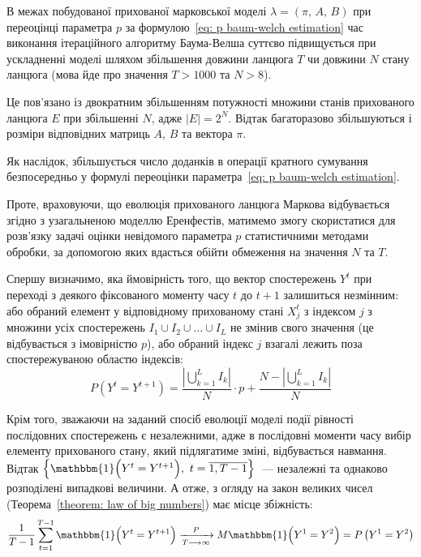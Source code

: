 В межах побудованої прихованої марковської моделі $\lambda=(\pi,\,A,\,B)$ при переоцінці параметра $p$ за формулою~\eqref{eq: p baum-welch estimation} час виконання ітераційного алгоритму Баума-Велша суттєво підвищується при ускладненні моделі шляхом збільшення довжини ланцюга $T$ чи довжини $N$ стану ланцюга (мова йде про значення $T>1000$ та $N>8$). 

Це пов'язано із двократним збільшенням потужності множини станів прихованого ланцюга $E$ при збільшенні $N$, адже $|E|=2^N$. Відтак багаторазово збільшуються і розміри відповідних матриць $A$, $B$ та вектора $\pi$. 

Як наслідок, збільшується число доданків в операції кратного сумування безпосередньо у формулі переоцінки параметра~\eqref{eq: p baum-welch estimation}.

Проте, враховуючи, що еволюція прихованого ланцюга Маркова відбувається згідно з узагальненою моделлю Еренфестів, матимемо змогу скористатися для розв'язку задачі оцінки невідомого параметра $p$ статистичними методами обробки, за допомогою яких вдасться обійти обмеження на значення $N$ та $T$.

Спершу визначимо, яка ймовірність того, що вектор спостережень $Y^t$ при переході з деякого фіксованого моменту часу $t$ до $t+1$ залишиться незмінним: або обраний елемент у відповідному прихованому стані $X^t_j$ з індексом $j$ з множини усіх спостережень $I_1 \cup I_2 \cup \ldots \cup I_L$ не змінив свого значення (це відбувається з імовірністю $p$), або обраний індекс $j$ взагалі лежить поза спостережуваною областю індексів:
\begin{equation}\label{eq: equality of successive observations}
    P\left( Y^t=Y^{t+1} \right) = \frac{\left| \bigcup\limits_{k=1}^{L}I_k \right|}{N}\cdot p + \frac{N-\left| \bigcup\limits_{k=1}^{L}I_k \right|}{N}
\end{equation}

Крім того, зважаючи на заданий спосіб еволюції моделі події рівності послідовних спостережень є незалежними, адже в послідовні моменти часу вибір елементу прихованого стану, який підлягатиме зміні, відбувається навмання. Відтак $\left\{ \mathbbm{1} \Bigl( Y^t=Y^{t+1} \Bigr),\ t=\overline{1,T-1} \right\}$~--- незалежні та однаково розподілені випадкові величини. А отже, з огляду на закон великих чисел (Теорема~\ref{theorem: law of big numbers}) має місце збіжність:
\begin{equation}\label{eq: LBN parameter p}
    \frac{1}{T-1}\sum_{t=1}^{T-1}\mathbbm{1} \Bigl( Y^t=Y^{t+1} \Bigr) \xrightarrow[T \longrightarrow \infty]{P} M\mathbbm{1} \Bigl( Y^1=Y^2 \Bigr) = P\left( Y^1=Y^2 \right)
\end{equation}

